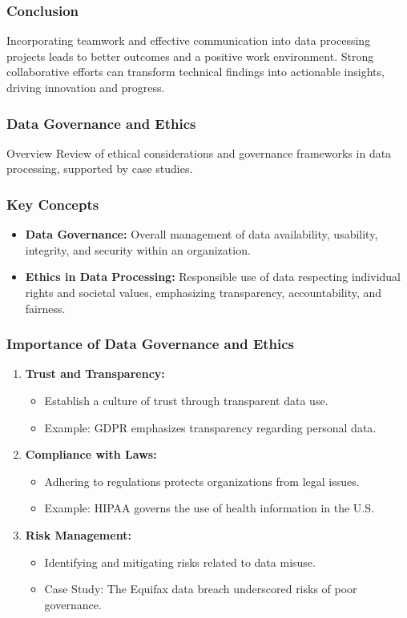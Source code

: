 \documentclass[aspectratio=169]{beamer}
\begin{document}
\begin{frame}[fragile]
    \frametitle{Conclusion}
    Incorporating teamwork and effective communication into data processing projects leads to better outcomes and a positive work environment. 
    Strong collaborative efforts can transform technical findings into actionable insights, driving innovation and progress.
\end{frame}

\begin{frame}[fragile]
    \frametitle{Data Governance and Ethics}
    \begin{block}{Overview}
        Review of ethical considerations and governance frameworks in data processing, supported by case studies.
    \end{block}
\end{frame}

\begin{frame}[fragile]
    \frametitle{Key Concepts}
    \begin{itemize}
        \item \textbf{Data Governance:} Overall management of data availability, usability, integrity, and security within an organization.
        \item \textbf{Ethics in Data Processing:} Responsible use of data respecting individual rights and societal values, emphasizing transparency, accountability, and fairness.
    \end{itemize}
\end{frame}

\begin{frame}[fragile]
    \frametitle{Importance of Data Governance and Ethics}
    \begin{enumerate}
        \item \textbf{Trust and Transparency:}
            \begin{itemize}
                \item Establish a culture of trust through transparent data use.
                \item Example: GDPR emphasizes transparency regarding personal data.
            \end{itemize}
        \item \textbf{Compliance with Laws:}
            \begin{itemize}
                \item Adhering to regulations protects organizations from legal issues.
                \item Example: HIPAA governs the use of health information in the U.S.
            \end{itemize}
        \item \textbf{Risk Management:}
            \begin{itemize}
                \item Identifying and mitigating risks related to data misuse.
                \item Case Study: The Equifax data breach underscored risks of poor governance.
            \end{itemize}
    \end{enumerate}
\end{frame}
\end{document}
